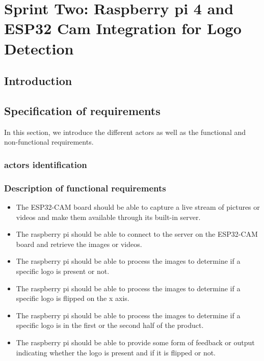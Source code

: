 %
%



\chapter{Sprint Two: Raspberry pi 4 and ESP32 Cam Integration for Logo Detection}
\section*{Introduction}
\section{Specification of requirements}
In this section, we introduce the different actors as well as the functional and non-functional requirements.
\subsection{actors identification }
\subsection{Description of functional requirements}
\begin{itemize}
\item The ESP32-CAM board should be able to capture a live stream of pictures or videos and make them available through its built-in server.
\item The raspberry pi should be able to connect to the server on the ESP32-CAM board and retrieve the images or videos.
\item The raspberry pi should be able to process the images to determine if a specific logo is present or not.
\item The raspberry pi should be able to process the images to determine if a specific logo is flipped on the x axis.
\item The raspberry pi should be able to process the images to determine if a specific logo is in the first or the second half of the product.
\item The raspberry pi should be able to provide some form of feedback or output indicating whether the logo is present and if it is flipped or not.
\end{itemize}
